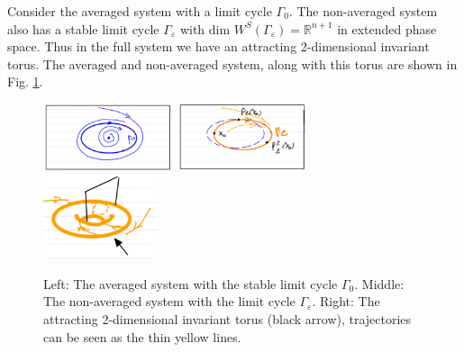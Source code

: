 \begin{ex}
	Consider the averaged system with a limit cycle $\Gamma_0$. The non-averaged system also has a stable limit cycle $\Gamma_\varepsilon$ with $ \textrm{dim }W^{S}(\Gamma_\varepsilon) =\mathbb{R}^{n+1} $ in extended phase space. Thus in the full system we have an attracting 2-dimensional invariant torus. The averaged and non-averaged system, along with this torus are shown in Fig. \ref{fig:avg_ex_3}.
	\begin{figure}[h!]
		\centering
		\includegraphics[width=0.34\textwidth]{figures/ch5/8avg_ex_4a.png}
		\includegraphics[width=0.34\textwidth]{figures/ch5/9avg_ex_4b.png}
		\includegraphics[width=0.3\textwidth]{figures/ch5/10avg_ex_4c.png}
		\caption{Left: The averaged system with the stable limit cycle $\Gamma_0$. Middle: The non-averaged system with the limit cycle $\Gamma_{\varepsilon}$. Right: The attracting 2-dimensional invariant torus (black arrow), trajectories can be seen as the thin yellow lines.}
		\label{fig:avg_ex_3}
	\end{figure}
	
\end{ex}

